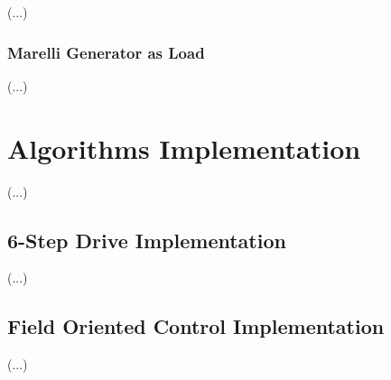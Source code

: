 (...)\\

\subsubsection{Marelli Generator as Load}

(...)\\

\section{Algorithms Implementation}

(...)\\

\subsection{6-Step Drive Implementation}

(...)\\

\subsection{Field Oriented Control Implementation}

(...)\\






